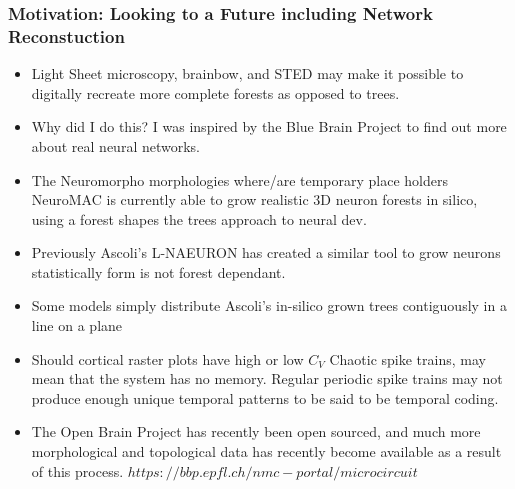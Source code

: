 \documentclass{beamer}
\begin{document}
\begin{frame}
\frametitle{Motivation: Looking to a Future including Network Reconstuction}%
\begin{itemize}
\vfill \item Light Sheet microscopy, brainbow, and STED may make it possible to digitally recreate more complete forests as opposed to trees.
\vfill\item Why did I do this? I was inspired by the Blue Brain Project to find out more about real neural networks.
\vfill\item The Neuromorpho morphologies where/are temporary place holders NeuroMAC is currently able to grow realistic 3D neuron forests in silico, using a forest shapes the trees approach to neural dev.
\vfill\item Previously Ascoli's L-NAEURON has created a similar tool to grow neurons statistically form is not forest dependant.
\vfill\item Some models simply distribute Ascoli's in-silico grown trees contiguously in a line on a plane
\vfill\item Should cortical raster plots have high or low $ C_{V} $ Chaotic spike trains, may mean that the system has no memory. Regular periodic spike trains may not produce enough unique temporal patterns to be said to be temporal coding.
\vfill \item The Open Brain Project has recently been open sourced, and much more morphological and topological data has recently become available as a result of this process. $https://bbp.epfl.ch/nmc-portal/microcircuit$
\end{itemize}
\end{frame}
\end{document}
